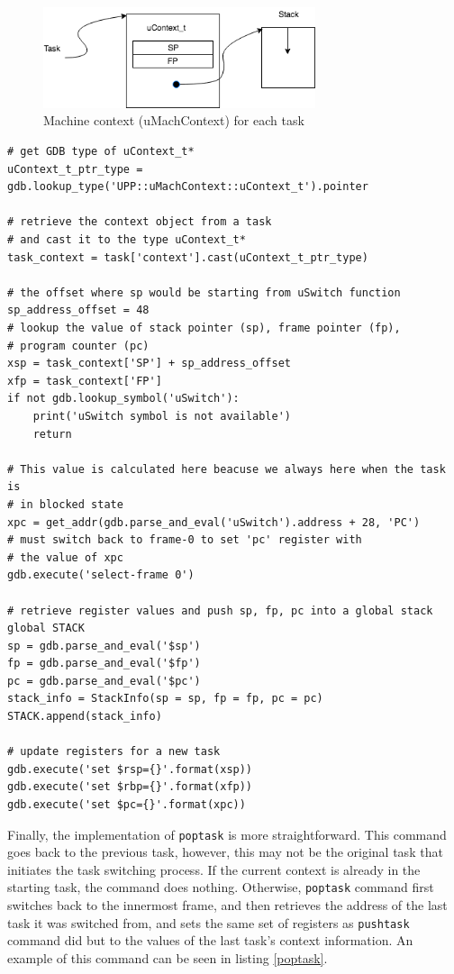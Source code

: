 \begin{figure}[h]
    \caption{Machine context (uMachContext) for each task}
    \includegraphics[width=8cm]{uContext_stack}
    \centering
\end{figure}

\begin{lstlisting}[style=Python, caption={Abridged \text{push\_task} source
code}, label={pushtask-code}, basicstyle=\small]
# get GDB type of uContext_t*
uContext_t_ptr_type = gdb.lookup_type('UPP::uMachContext::uContext_t').pointer

# retrieve the context object from a task
# and cast it to the type uContext_t*
task_context = task['context'].cast(uContext_t_ptr_type)

# the offset where sp would be starting from uSwitch function
sp_address_offset = 48
# lookup the value of stack pointer (sp), frame pointer (fp),
# program counter (pc)
xsp = task_context['SP'] + sp_address_offset
xfp = task_context['FP']
if not gdb.lookup_symbol('uSwitch'):
    print('uSwitch symbol is not available')
    return

# This value is calculated here beacuse we always here when the task is
# in blocked state
xpc = get_addr(gdb.parse_and_eval('uSwitch').address + 28, 'PC')
# must switch back to frame-0 to set 'pc' register with
# the value of xpc
gdb.execute('select-frame 0')

# retrieve register values and push sp, fp, pc into a global stack
global STACK
sp = gdb.parse_and_eval('$sp')
fp = gdb.parse_and_eval('$fp')
pc = gdb.parse_and_eval('$pc')
stack_info = StackInfo(sp = sp, fp = fp, pc = pc)
STACK.append(stack_info)

# update registers for a new task
gdb.execute('set $rsp={}'.format(xsp))
gdb.execute('set $rbp={}'.format(xfp))
gdb.execute('set $pc={}'.format(xpc))
\end{lstlisting}

Finally, the implementation of \verb|poptask| is more straightforward. This command goes back to the previous task, however, this may not be the original
task that initiates the task switching process. If the current context is
already in the starting task, the command does nothing. Otherwise,
\verb|poptask| command first switches back to the innermost frame, and then
retrieves the
address of the last task it was switched from, and sets the same set of registers as
\verb|pushtask| command did but to the values of the last task's context
information. An example of this command can be seen in listing \ref{poptask}.

